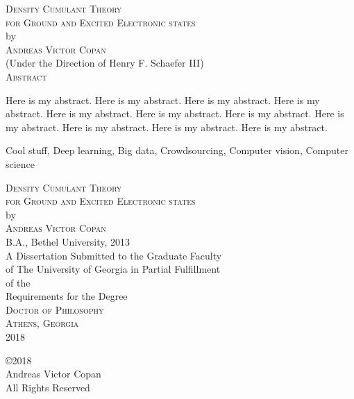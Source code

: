 \documentclass[12pt,notitlepage]{report}
\newcommand{\dissertationtitle}{%
    Density Cumulant Theory\\for Ground and Excited Electronic states}
\newcommand{\whoami}{Andreas Victor Copan}
\begin{document}
\newpage
\thispagestyle{empty}
\vspace*{18pt}
\begin{center}
\textsc{\large{\dissertationtitle}}\\[18pt]
by\\[18pt]
\textsc{\whoami}\\[12pt]
(Under the Direction of Henry F. Schaefer III)\\[12pt]
\textsc{Abstract}
\end{center}
Here is my abstract. Here is my abstract. Here is my abstract. Here is my
abstract. Here is my abstract. Here is my abstract. Here is my abstract. Here is
my abstract. Here is my abstract. Here is my abstract. Here is my abstract.
\thispagestyle{empty}

\begin{list}{\textsc{Index words:\hfill}}{\leftmargin 1.4in}
\item 
\begin{flushleft}\singlespacing
Cool stuff,
Deep learning,
Big data,
Crowdsourcing,
Computer vision,
Computer science
\end{flushleft}
\end{list}

\newpage
{}
\thispagestyle{empty}
\vspace*{18pt}
\begin{center}
\textsc{\large{\dissertationtitle}}\\[18pt]
by\\[18pt]
\textsc{\whoami}\\[12pt]
B.A., Bethel University, 2013\\
\vfill
A Dissertation Submitted to the Graduate Faculty \\
of The University of Georgia in Partial Fulfillment \\
of the \\
Requirements for the Degree \\[10pt]
\textsc{Doctor of Philosophy}\\[36pt]
\textsc{Athens, Georgia}\\[18pt]
2018
\end{center}

\newpage
\thispagestyle{empty}
\vspace*{5.5in}
\begin{center}
\copyright 2018 \\
\whoami \\
All Rights Reserved
\end{center}
\end{document}
